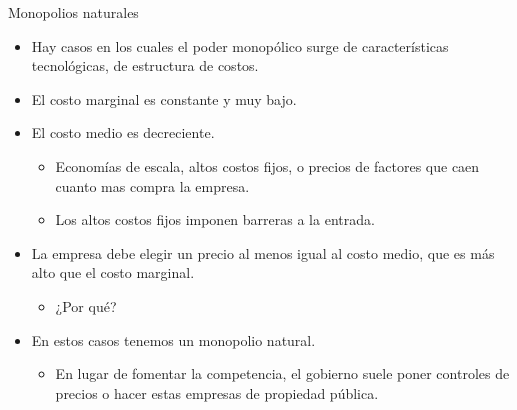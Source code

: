 \documentclass{beamer}
\begin{document}
\begin{frame}{Monopolios naturales}
    \begin{itemize}
        \item Hay casos en los cuales el poder monopólico surge de características tecnológicas, de estructura de costos.
        \item El costo marginal es constante y muy bajo.
        \item El costo medio es decreciente. 
        \begin{itemize}
            \item Economías de escala, altos costos fijos, o precios de factores que caen cuanto mas compra la empresa.
            \item Los altos costos fijos imponen barreras a la entrada.
        \end{itemize}
        \item La empresa debe elegir un precio al menos igual al costo medio, que es más alto que el costo marginal.
        \begin{itemize}
            \item ¿Por qué?
        \end{itemize}
        \item En estos casos tenemos un monopolio natural.
        \begin{itemize}
            \item En lugar de fomentar la competencia, el gobierno suele poner controles de precios o hacer estas empresas de propiedad pública.
        \end{itemize}
    \end{itemize}
\end{frame}
\end{document}
